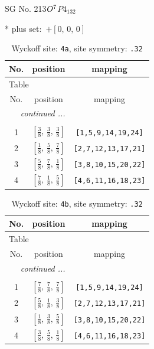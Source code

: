 \documentclass[fleqn,8pt]{jsarticle}
\begin{document}
\setcounter{MaxMatrixCols}{32}

\renewcommand{\tablename}{Table~}
\renewcommand{\figurename}{Figure~}
\begin{center}
\LARGE
SG No. 213\quad$O_{\rm }^{7}$\quad$P4_132$\quad[ cubic ]
\end{center}
* plus set:\,\,\,$+\left[ 0,\, 0,\, 0 \right]$
\renewcommand{\arraystretch}{1.2}
\begin{longtable}{ccc}
\caption{Wyckoff site: {\tt 4a}, site symmetry: {\tt .32}}
 \\
 \hline \hline
No. & position & mapping \\ \hline \endfirsthead

\multicolumn{2}{l}{\tablename\ \thetable{}} \\
 \hline \hline
No. & position & mapping \\ \hline \endhead

 \hline \hline
\multicolumn{2}{r}{\footnotesize\it continued ...} \\ \endfoot

 \hline \hline
\multicolumn{2}{r}{} \\ \endlastfoot

1 & $\left[ \frac{3}{8},\, \frac{3}{8},\, \frac{3}{8} \right]$ & {\tt [1,5,9,14,19,24]} \\ \hline
2 & $\left[ \frac{1}{8},\, \frac{5}{8},\, \frac{7}{8} \right]$ & {\tt [2,7,12,13,17,21]} \\ \hline
3 & $\left[ \frac{5}{8},\, \frac{7}{8},\, \frac{1}{8} \right]$ & {\tt [3,8,10,15,20,22]} \\ \hline
4 & $\left[ \frac{7}{8},\, \frac{1}{8},\, \frac{5}{8} \right]$ & {\tt [4,6,11,16,18,23]} \\
\end{longtable}
\renewcommand{\arraystretch}{1.2}
\begin{longtable}{ccc}
\caption{Wyckoff site: {\tt 4b}, site symmetry: {\tt .32}}
 \\
 \hline \hline
No. & position & mapping \\ \hline \endfirsthead

\multicolumn{2}{l}{\tablename\ \thetable{}} \\
 \hline \hline
No. & position & mapping \\ \hline \endhead

 \hline \hline
\multicolumn{2}{r}{\footnotesize\it continued ...} \\ \endfoot

 \hline \hline
\multicolumn{2}{r}{} \\ \endlastfoot

1 & $\left[ \frac{7}{8},\, \frac{7}{8},\, \frac{7}{8} \right]$ & {\tt [1,5,9,14,19,24]} \\ \hline
2 & $\left[ \frac{5}{8},\, \frac{1}{8},\, \frac{3}{8} \right]$ & {\tt [2,7,12,13,17,21]} \\ \hline
3 & $\left[ \frac{1}{8},\, \frac{3}{8},\, \frac{5}{8} \right]$ & {\tt [3,8,10,15,20,22]} \\ \hline
4 & $\left[ \frac{3}{8},\, \frac{5}{8},\, \frac{1}{8} \right]$ & {\tt [4,6,11,16,18,23]} \\
\end{longtable}
\end{document}
